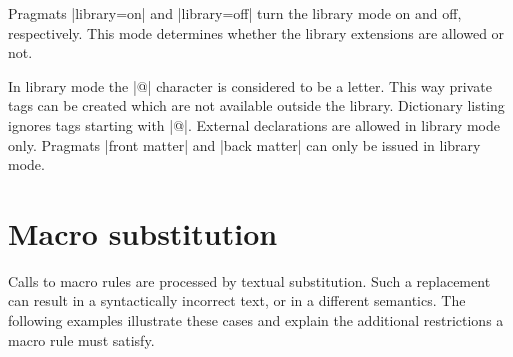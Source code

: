 \documentclass{article}
\begin{document}
Pragmats \pp|library=on| and \pp|library=off| turn the library mode on and
off, respectively. This mode determines whether the library extensions are
allowed or not. 

In library mode the \pp|@| character is considered to be a letter. This way
private tags can be created which are not available outside the library.
Dictionary listing ignores tags starting with \pp|@|.
External declarations are allowed in library mode only.
Pragmats \pp|front matter| and \pp|back matter| can only be issued in library
mode.


\section{Macro substitution}\label{sec:macro}

Calls to macro rules are processed by textual substitution. Such a
replacement can result in a syntactically incorrect text, or in a
different semantics. The following examples illustrate these cases and
explain the additional restrictions a macro rule must satisfy.
\end{document}
